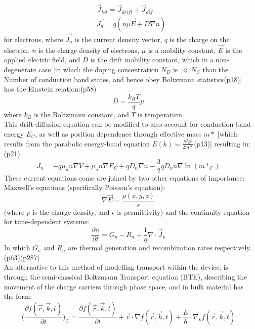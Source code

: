 \documentclass[titlepage]{article}
\begin{document}
\begin{eqnarray}
&\vec{J}_{tot} = \vec{J}_{drift} + \vec{J}_{dif}\\
&\vec{J_n} = q(n\mu\vec{E} + D\nabla n)
\end{eqnarray}
for electrons, where $\vec{J_n}$ is the current density vector, $q$ is the charge on the electron, $n$ is the charge density of electrons, $\mu$ is a mobility constant, $\vec{E}$ is the applied electric field, and $D$ is the drift mobility constant, which in a non-degenerate case [in which the doping concentration $N_D$ is $\ll N_C$ than the Number of conduction band states, and hence obey Boltzmann statistics\cite{Sze}(p18)] has the Einstein relation:\cite{SzeHiSpeed}(p58)
\begin{equation}
D = \frac{k_B T}{q}\mu
\end{equation}
where $k_B$ is the Boltzmann constant, and $T$ is temperature. \\
This drift-diffusion equation can be modified to also account for conduction band energy $E_C$, as well as position dependence through effective mass $m*$ [which results from the parabolic energy-band equation $E(k) = \frac{\hbar^2k^2}{2m*}$\cite{Sze}(p13)] resulting in:\cite{Frensley}(p21)
\begin{equation}
J_n = -q\mu_n n \nabla V + \mu_n n \nabla E_C + q D_n \nabla n - \frac{3}{2}qD_n n \nabla \ln(m*_C)
\end{equation}
These current equations come are joined by two other equations of importance: Maxwell's equations (specifically Poisson's equation):
\begin{equation}
\nabla \vec{E} = \frac{\rho(x,y,z)}{\epsilon}
\end{equation}
(where $\rho$ is the charge density, and $\epsilon$ is permittivity) and the continuity equation for time-dependent systems:
\begin{equation}
\dfrac{\partial n}{\partial t} = G_n - R_n + \frac{1}{q}\nabla\cdot\vec{J}_n
\end{equation}
In which $G_n$ and $R_n$ are thermal generation and recombination rates respectively.\cite{Sze}(p63)\cite{NSD}(p287)\\
\bigskip
An alternative to this method of modelling transport within the device, is through the semi-classical Boltzmann Transport equation (BTE), describing the movement of the charge carriers through phase space, and in bulk material has the form:
\begin{equation}
\Big(\dfrac{\partial f(\vec{r},\vec{k},t)}{\partial t}\Big)_C = \dfrac{\partial f(\vec{r},\vec{k},t)}{\partial t} + \vec{v}\cdot\nabla f(\vec{r},\vec{k},t) + \frac{E}{\hbar}\cdot\nabla_k f(\vec{r},\vec{k},t)
\end{equation}
\end{document}
